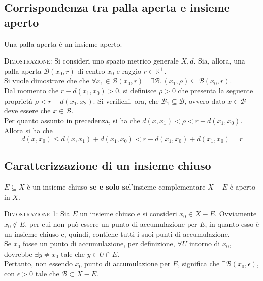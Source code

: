 \documentclass[a4paper]{extarticle}
\begin{document}
\subsection{Corrispondenza tra palla aperta e insieme aperto}
Una palla aperta è un insieme aperto.

\vspace{2em}
\noindent
\normalfont \normalsize
\textsc{Dimostrazione}: Si consideri uno spazio metrico generale $X,d$. Sia, allora, una palla aperta $\mathcal{B}(x_0,r)$ di centro $x_0$ e raggio $r \in \mathbb{R}^+$.\\
Si vuole dimostrare che che $\forall x_1 \in \mathcal{B}(x_0,r) \hspace{1em} \exists \mathcal{B}_1(x_1,\rho) \subseteq \mathcal{B}(x_0,r)$.\\
Dal momento che $r-d(x_1,x_0) > 0$, si definisce $\rho > 0$ che presenta la seguente proprietà $\rho < r - d(x_1,x_2)$. Si verifichi, ora, che $\mathcal{B}_1 \subseteq \mathcal{B}$, ovvero dato $x \in \mathcal{B}$ deve essere che $x \in \mathcal{B}$.\\
Per quanto assunto in precedenza, si ha che $d(x,x_1) < \rho < r-d(x_1,x_0)$. Allora si ha che
\[d(x,x_0) \leq d(x,x_1) + d(x_1,x_0) < r - d(x_1,x_0)+d(x_1,x_0) = r\]

\vspace{1em}
\subsection{Caratterizzazione di un insieme chiuso}
$E \subseteq X$ è un insieme chiuso \textbf{se e solo se}l'insieme complementare $X-E$ è aperto in $X$.

\vspace{2em}
\noindent
\normalfont \normalsize
\textsc{Dimostrazione 1}: Sia $E$ un insieme chiuso e si consideri $x_0 \in X-E$. Ovviamente $x_0 \notin E$, per cui non può essere un punto di accumulazione per $E$, in quanto esso è un insieme chiuso e, quindi, contiene tutti i suoi punti di accumulazione.\\
Se $x_0$ fosse un punto di accumulazione, per definizione, $\forall U$ intorno di $x_0$, dovrebbe $\exists y \neq x_0$ tale che $y \in U \cap E$.\\
Pertanto, non essendo $x_0$ punto di accumulazione per $E$, significa che $\exists \mathcal{B}(x_0,\epsilon)$, con $\epsilon>0$ tale che $\mathcal{B} \subset X - E$.
\end{document}
